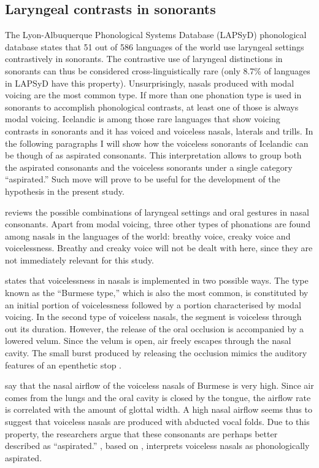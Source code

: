 \documentclass[11pt,a4paper,openany]{memoir}\usepackage[]{graphicx}\usepackage[]{color}
\begin{document}
\subsection{Laryngeal contrasts in sonorants}
The Lyon-Albuquerque Phonological Systems Database (LAPSyD) phonological database \citep{Maddieson2012} states that 51 out of 586 languages of the world use laryngeal settings contrastively in sonorants.
The contrastive use of laryngeal distinctions in sonorants can thus be considered cross-linguistically rare (only 8.7\% of languages in LAPSyD have this property).
Unsurprisingly, nasals produced with modal voicing are the most common type.
If more than one phonation type is used in sonorants to accomplish phonological contrasts, at least one of those is always modal voicing.
Icelandic is among those rare languages that show voicing contrasts in sonorants and it has voiced and voiceless nasals, laterals and trills.
In the following paragraphs I will show how the voiceless sonorants of Icelandic can be though of as aspirated consonants.
This interpretation allows to group both the aspirated consonants and the voiceless sonorants under a single category ``aspirated.''
Such move will prove to be useful for the development of the hypothesis in the present study.

\citet{ladefoged1996} reviews the possible combinations of laryngeal settings and oral gestures in nasal consonants.
Apart from modal voicing, three other types of phonations are found among nasals in the languages of the world: breathy voice, creaky voice and voicelessness.
Breathy and creaky voice will not be dealt with here, since they are not immediately relevant for this study.

\citet{bhaskararao1991} states that voicelessness in nasals is implemented in two possible ways.
The type known as the ``Burmese type,'' which is also the most common, is constituted by an initial portion of voicelessness followed by a portion characterised by modal voicing.
In the second type of voiceless nasals, the segment is voiceless through out its duration.
However, the release of the oral occlusion is accompanied by a lowered velum.
Since the velum is open, air freely escapes through the nasal cavity.
The small burst produced by releasing the occlusion mimics the auditory features of an epenthetic stop \citep[84]{bhaskararao1991}.

\citep[111]{ladefoged1996} say that the nasal airflow of the voiceless nasals of Burmese is very high.
Since air comes from the lungs and the oral cavity is closed by the tongue, the airflow rate is correlated with the amount of glottal width.
A high nasal airflow seems thus to suggest that voiceless nasals are produced with abducted vocal folds.
Due to this property, the researchers argue that these consonants are perhaps better described as ``aspirated.''
\citep[82]{kehrein2002}, based on \citep{ladefoged1996}, interprets voiceless nasals as phonologically aspirated.
\end{document}
